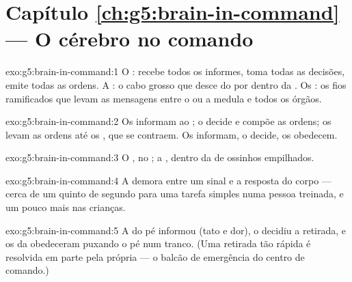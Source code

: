\section*{Capítulo \ref{ch:g5:brain-in-command} --- O cérebro no comando}

\begin{solution}{exo:g5:brain-in-command:1}
O : recebe todos os informes, toma todas as decisões, emite
todas as ordens. A : o cabo grosso que desce do
 por dentro da . Os : os fios ramificados que
levam as mensagens entre o  ou a medula e todos os órgãos.
\end{solution}

\begin{solution}{exo:g5:brain-in-command:2}
Os  informam ao ; o  decide e compõe
as ordens; os  levam as ordens até os , que se
contraem. Os  informam, o  decide, os
 obedecem.
\end{solution}

\begin{solution}{exo:g5:brain-in-command:3}
O , no ; a , dentro da  de
ossinhos empilhados.
\end{solution}

\begin{solution}{exo:g5:brain-in-command:4}
A demora entre um sinal e a resposta do corpo --- cerca de um quinto
de segundo para uma tarefa simples numa pessoa treinada, e um pouco
mais nas crianças.
\end{solution}

\begin{solution}{exo:g5:brain-in-command:5}
A  do pé informou (tato e dor), o  decidiu a
retirada, e os  da  obedeceram puxando o pé num tranco.
(Uma retirada tão rápida é resolvida em parte pela própria  --- o balcão de emergência do centro de comando.)
\end{solution}

